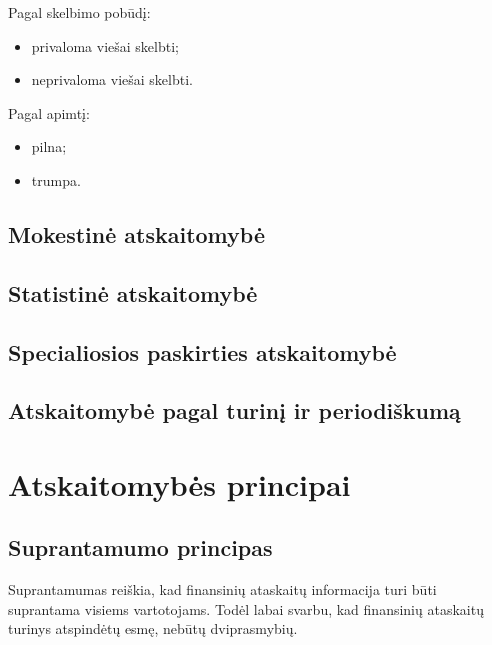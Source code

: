 
Pagal skelbimo pobūdį:
\begin{itemize}
  \item privaloma viešai skelbti;
  \item neprivaloma viešai skelbti.
\end{itemize}


Pagal apimtį:
\begin{itemize}
  \item pilna;
  \item trumpa.
\end{itemize}

\subsection{Mokestinė atskaitomybė} 


\subsection{Statistinė atskaitomybė}


\subsection{Specialiosios paskirties atskaitomybė}


\subsection{Atskaitomybė pagal turinį ir periodiškumą}


\section{Atskaitomybės principai}


\subsection{Suprantamumo principas}


Suprantamumas reiškia, kad finansinių ataskaitų informacija turi būti
suprantama visiems vartotojams. Todėl labai svarbu, kad finansinių
ataskaitų turinys atspindėtų esmę, nebūtų dviprasmybių.

